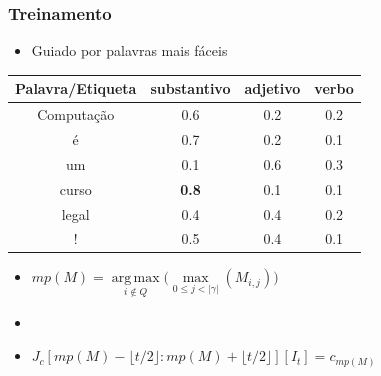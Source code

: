 \documentclass[10pt]{beamer}
\DeclareMathOperator*{\argmax}{arg\,max}
\begin{document}
\begin{frame}[fragile]
\frametitle{Treinamento}
  
  \begin{itemize}

    \item Guiado por palavras mais fáceis \cite{shen2007guided}


  \end{itemize}

  \begin{table}[!htb]
  \scriptsize
  \begin{center}
  \begin{tabular}{c|c|c|c}
    \toprule
    Palavra/Etiqueta & substantivo & adjetivo & verbo \\
    \midrule
    Computação & 0.6 & 0.2 & 0.2 \\
    \midrule
    é          & 0.7 & 0.2 & 0.1 \\
    \midrule
    um         & 0.1 & 0.6 & 0.3 \\
    \midrule
    curso      & \textbf{0.8} & 0.1 & 0.1 \\
    \midrule
    legal      & 0.4 & 0.4 & 0.2 \\
    \midrule
    !          & 0.5 & 0.4 & 0.1 \\
    \bottomrule
  \end{tabular}
  \end{center}
  \end{table}

  \begin{itemize}
  \item[\ ] $mp(M) = \argmax\limits_{i \not \in Q}\Big(\max\limits_{0 \leq j < |\gamma|}(M_{i,j})\Big)$
  \item[\ ] \   
  \item[\ ]  $J_c[mp(M)-\lfloor t/2 \rfloor:mp(M)+\lfloor t/2 \rfloor][I_t] = c_{mp(M)}$
  \end{itemize}

\end{frame}
\end{document}
